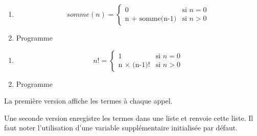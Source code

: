\documentclass[a4paper,11pt]{article}
\begin{document}
\begin{Form}
\begin{exo}
\begin{enumerate}
\item $$
somme(n) = \left\{
    \begin{array}{ll}
        0 & \mbox{si  }n=0\\
        \mbox{n + somme(n-1)} & \mbox{si }n>0\
    \end{array}
\right.
$$
\item Programme

\end{enumerate}
\end{exo}
\begin{exo}
\begin{enumerate}
\item $$
n! = \left\{
    \begin{array}{ll}
        1 & \mbox{si  }n=0\\
        \mbox{n × (n-1)!} & \mbox{si }n>0\
    \end{array}
\right.
$$
\item Programme

\end{enumerate}
\end{exo}
\begin{exo}
La première version affiche les termes à chaque appel.

Une seconde version enregistre les termes dans une liste et renvoie cette liste. Il faut noter l'utilisation d'une variable supplémentaire initialisée par défaut.

\begin{commentprof}

\end{commentprof}
\end{exo}
\end{Form}
\end{document}
